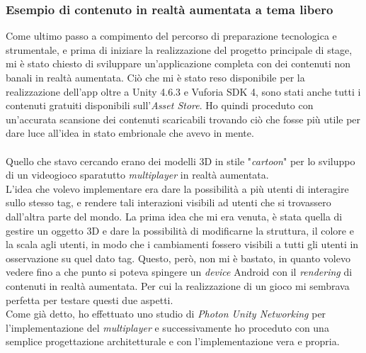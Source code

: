 \subsubsection{Esempio di contenuto in realt\`a aumentata a tema libero}
Come ultimo passo a compimento del percorso di preparazione tecnologica e strumentale, e prima di iniziare la realizzazione del progetto principale di stage, mi \`e stato chiesto di sviluppare un'applicazione completa con dei contenuti non banali in realt\`a aumentata. Ci\`o che mi \`e stato reso disponibile per la realizzazione dell'app oltre a Unity 4.6.3 e Vuforia SDK 4, sono stati anche tutti i contenuti gratuiti disponibili sull'\textit{Asset Store}. Ho quindi proceduto con un'accurata scansione dei contenuti scaricabili trovando ci\`o che fosse pi\`u utile per dare luce all'idea in stato embrionale che avevo in mente.\\\\
Quello che stavo cercando erano dei modelli 3D in stile "\textit{cartoon}" per lo sviluppo di un videogioco sparatutto \textit{multiplayer} in realt\`a aumentata.\\
L'idea che volevo implementare era dare la possibilit\`a a pi\`u utenti di interagire sullo stesso tag, e rendere tali interazioni visibili ad utenti che si trovassero dall'altra parte del mondo. La prima idea che mi era venuta, \`e stata quella di gestire un oggetto 3D e dare la possibilit\`a di modificarne la struttura, il colore e la scala agli utenti, in modo che i cambiamenti fossero visibili a tutti gli utenti in osservazione su quel dato tag. Questo, per\`o, non mi \`e bastato, in quanto volevo vedere fino a che punto si poteva spingere un \textit{device} Android con il \textit{rendering} di contenuti in realt\`a aumentata. Per cui la realizzazione di un gioco mi sembrava perfetta per testare questi due aspetti.\\

Come gi\`a detto, ho effettuato uno studio di \textit{Photon Unity Networking} per l'implementazione del \textit{multiplayer} e successivamente ho proceduto con una semplice progettazione architetturale e con l'implementazione vera e propria.\\

